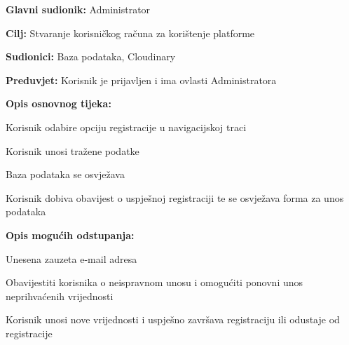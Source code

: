 \noindent {}
\begin{packed_item}
	
	\item \textbf{Glavni sudionik:} Administrator
	\item  \textbf{Cilj:} Stvaranje korisničkog računa za korištenje platforme
	\item  \textbf{Sudionici:} Baza podataka, Cloudinary
	\item  \textbf{Preduvjet:} Korisnik je prijavljen i ima ovlasti Administratora
	\item  \textbf{Opis osnovnog tijeka:}
	
	\item[] \begin{packed_enum}
		
		\item Korisnik odabire opciju registracije u navigacijskoj traci
		\item Korisnik unosi tražene podatke 
		\item Baza podataka se osvježava
		\item Korisnik dobiva  obavijest o uspješnoj registraciji te se osvježava forma za unos podataka
		
	\end{packed_enum}
	
	\item  \textbf{Opis mogućih odstupanja:}
	
	\item[] \begin{packed_item}
		
		\item[2.a] Unesena zauzeta e-mail adresa
		\item[] \begin{packed_enum}
			
			\item Obavijestiti korisnika o neispravnom unosu i omogućiti ponovni unos neprihvaćenih vrijednosti
			\item Korisnik unosi nove vrijednosti i uspješno završava registraciju ili odustaje od registracije 
			
		\end{packed_enum}
	\end{packed_item}
	
\end{packed_item}

